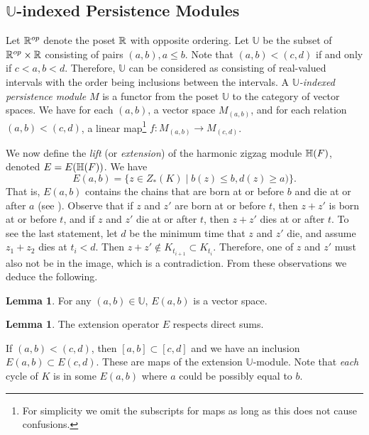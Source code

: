 \documentclass[10pt,a4paper]{amsart}
\newcommand {\mm}[1] {\ifmmode{#1}\else{\mbox{\(#1\)}}\fi}
\newcommand{\Rspace}        {\mm{\mathbb{R}}}
\newcommand{\har}           {\mm{\mathbb{H}}}
\theoremstyle{definition}
\newcommand{\filt}{F}
\newtheorem{lemma}[theorem]{Lemma}
\theoremstyle{remark}
\begin{document}
\subsection{$\mathbb{U}$-indexed Persistence Modules}\label{subsec:extension}


Let $\Rspace^{op}$ denote the poset $\Rspace$ with opposite ordering. Let $\mathbb{U}$ be the subset of $\Rspace^{op}\times \Rspace$ consisting of pairs $(a,b), a\leq b$. Note that $(a,b) < (c,d)$ if and only if $c<a, b < d$. Therefore, $\mathbb{U}$ can be considered as consisting of real-valued intervals with the order being inclusions between the intervals. A \emph{$\mathbb{U}$-indexed persistence module} $M$ is a functor from the poset $\mathbb{U}$ to the category of vector spaces. We have for each $(a,b)$, a vector space $M_{(a,b)}$, and for each relation $(a,b) < (c,d)$, a linear map\footnote{For simplicity we omit the subscripts for maps as long as this does not cause confusions.} $f:M_{(a,b)} \xrightarrow{} M_{(c,d)}$.

We now define the \emph{lift} (or \emph{extension}) of the harmonic zigzag module $\har(\filt)$, denoted $E= E(\har(\filt))$. We have $$ E(a,b) = \{ z \in Z_*(K)\mid b(z) \leq b ,  d(z)  \geq a) \}.$$ That is, $E(a,b)$ contains the chains that are born at or before $b$ and die at or after $a$ (see ). Observe that if $z$ and $z'$ are born at or before $t$, then $z+z'$ is born at or before $t$, and if $z$ and $z'$ die at or after $t$, then $z+z'$ dies at or after $t$. To see the last statement, let $d$ be the minimum  time that $z$ and $z'$ die, and assume $z_1+z_2$ dies at $t_i < d$. Then $z+z' \notin K_{t_{i+1}} \subset K_{t_i}$. Therefore, one of $z$ and $z'$ must also not be in the image, which is a contradiction. From these observations we deduce the following.   


\begin{lemma}
    For any $(a,b) \in \mathbb{U}$, $E(a,b)$ is a vector space. 
\end{lemma}

\begin{lemma}\label{l:directsum}
    The extension operator $E$ respects direct sums. 
\end{lemma}


If $(a,b) < (c,d) $, then $[a,b] \subset [c,d]$ and we have an inclusion $E(a,b) \subset E(c,d)$. These are maps of the extension $\mathbb{U}$-module. Note that \textit{each} cycle of $K$ is in some $E(a,b)$ 
where $a$ could be possibly equal to $b$.
\end{document}
